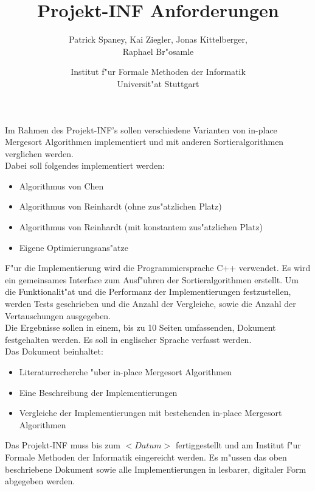 \documentclass[12pt,pdftex,a4paper]{article}
\begin{document}
\title{Projekt-INF Anforderungen}
\author{Patrick Spaney, Kai Ziegler, Jonas Kittelberger, \\ Raphael Br"osamle}
\date{Institut f"ur Formale Methoden der Informatik \\ Universit"at Stuttgart}
\maketitle
Im Rahmen des Projekt-INF's sollen verschiedene Varianten von in-place Mergesort Algorithmen implementiert und mit anderen Sortieralgorithmen verglichen werden. \\
Dabei soll folgendes implementiert werden:
\begin{itemize}
\item Algorithmus von Chen
\item Algorithmus von Reinhardt (ohne zus"atzlichen Platz)
\item Algorithmus von Reinhardt (mit konstantem zus"atzlichen Platz)
\item Eigene Optimierungsans"atze
\end{itemize}
F"ur die Implementierung wird die Programmiersprache C++ verwendet. Es wird ein gemeinsames Interface zum Ausf"uhren der Sortieralgorithmen erstellt. Um die Funktionalit"at und die Performanz der Implementierungen festzustellen, werden Tests geschrieben und die Anzahl der Vergleiche, sowie die Anzahl der Vertauschungen ausgegeben.\\
Die Ergebnisse sollen in einem, bis zu 10 Seiten umfassenden, Dokument festgehalten werden. Es soll in englischer Sprache verfasst werden.  \\
Das Dokument beinhaltet: 
\begin{itemize}
\item Literaturrecherche "uber in-place Mergesort Algorithmen
\item Eine Beschreibung der Implementierungen
\item Vergleiche der Implementierungen mit bestehenden in-place Mergesort Algorithmen
\end{itemize}
Das Projekt-INF muss bis zum $<Datum>$ fertiggestellt und am Institut f"ur Formale Methoden der Informatik eingereicht werden. Es m"ussen das oben beschriebene Dokument sowie alle Implementierungen in lesbarer, digitaler Form abgegeben werden.
\end{document}
